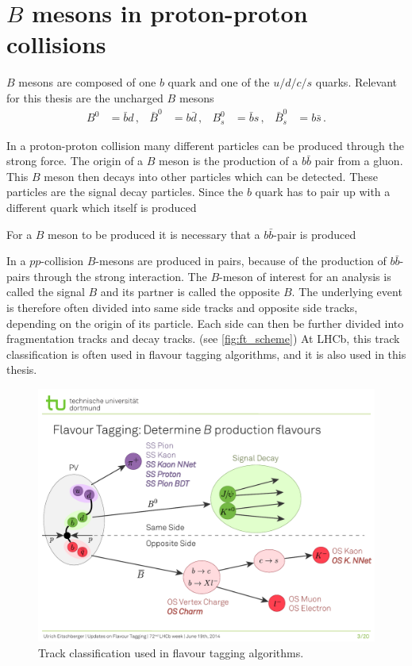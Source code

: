 \section{$B$ mesons in proton-proton collisions}

$B$ mesons are composed of one $b$ quark and one of the $u/d/c/s$ quarks.
Relevant for this thesis are the uncharged $B$ mesons
\begin{align*}
    B^0 &= \bar{b}d \, , & \bar{B}^0 &= b\bar{d} \, , & B_s^0 &= \bar{b}s \, , & \bar{B}_s^0 &= b\bar{s} \, .
\end{align*}

In a proton-proton collision many different particles can be produced through the strong force.
The origin of a $B$ meson is the production of a $b\bar{b}$ pair from a gluon.
This $B$ meson then decays into other particles which can be detected.
These particles are the signal decay particles.
Since the $b$ quark has to pair up with a different quark which itself is produced 

For a $B$ meson to be produced it is necessary that a $b\bar{b}$-pair is produced

In a $pp$-collision $B$-mesons are produced in pairs, because of the production of $b\bar{b}$-pairs through the strong interaction. 
The $B$-meson of interest for an analysis is called the signal $B$ and its partner is called the opposite $B$.
The underlying event is therefore often divided into same side tracks and opposite side tracks, depending on the origin of its particle.
Each side can then be further divided into fragmentation tracks and decay tracks. (see \autoref{fig:ft_scheme})
At LHCb, this track classification is often used in flavour tagging algorithms, and it is also used in this thesis.

\begin{figure}
    \centering
    \includegraphics[width=\textwidth]{images/FlavourTaggingScheme.pdf}
    \caption{Track classification used in flavour tagging algorithms. \cite{ft_scheme}}
    \label{fig:ft_scheme}
\end{figure}


